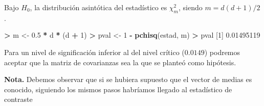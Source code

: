 \documentclass[
  a4paper,
  oneside]{scrbook}
\newenvironment{Shaded}{\begin{snugshade}}{\end{snugshade}}
\newcommand{\DecValTok}[1]{\textcolor[rgb]{0.00,0.00,0.81}{#1}}
\newcommand{\FloatTok}[1]{\textcolor[rgb]{0.00,0.00,0.81}{#1}}
\newcommand{\FunctionTok}[1]{\textcolor[rgb]{0.13,0.29,0.53}{\textbf{#1}}}
\newcommand{\NormalTok}[1]{#1}
\newcommand{\OtherTok}[1]{\textcolor[rgb]{0.56,0.35,0.01}{#1}}
\newcommand{\SpecialCharTok}[1]{\textcolor[rgb]{0.81,0.36,0.00}{\textbf{#1}}}
\theoremstyle{definition}
\theoremstyle{definition}
\theoremstyle{definition}
\theoremstyle{definition}
\theoremstyle{remark}
\begin{document}
\begin{Shaded}
\end{Shaded}

\normalsize

Bajo \(H_0\), la distribución asintótica del estadístico es \(\chi_m^2\),
siendo \(m=d(d+1)/2\).

\footnotesize

\begin{Shaded}
\begin{Highlighting}[]
\SpecialCharTok{\textgreater{}}\NormalTok{ m }\OtherTok{\textless{}{-}} \FloatTok{0.5} \SpecialCharTok{*}\NormalTok{ d }\SpecialCharTok{*}\NormalTok{ (d }\SpecialCharTok{+} \DecValTok{1}\NormalTok{)}
\SpecialCharTok{\textgreater{}}\NormalTok{ pval }\OtherTok{\textless{}{-}} \DecValTok{1} \SpecialCharTok{{-}} \FunctionTok{pchisq}\NormalTok{(estad, m)}
\SpecialCharTok{\textgreater{}}\NormalTok{ pval}
\NormalTok{[}\DecValTok{1}\NormalTok{] }\FloatTok{0.01495119}
\end{Highlighting}
\end{Shaded}

\normalsize

Para un nivel de significación inferior al del nivel crítico (\(0.0149\))
podremos aceptar que la matriz de covarianzas sea la que se planteó como
hipótesis.

\textbf{Nota.} Debemos observar que si se hubiera supuesto que el vector de
medias es conocido, siguiendo los mismos pasos habríamos llegado al
estadístico de contraste
\end{document}
